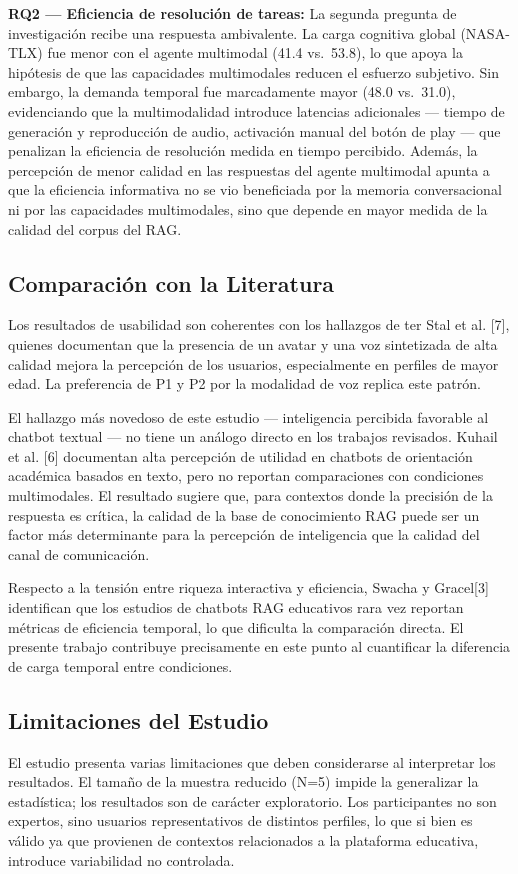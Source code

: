 \documentclass[conference]{IEEEtran}
\begin{document}
\textbf{RQ2 --- Eficiencia de resolución de tareas:} La segunda pregunta de investigación recibe una respuesta ambivalente. La carga cognitiva global (NASA-TLX) fue menor con el agente multimodal (41.4 vs.~53.8), lo que apoya la hipótesis de que las capacidades multimodales reducen el esfuerzo subjetivo. Sin embargo, la demanda temporal fue marcadamente mayor (48.0 vs.~31.0), evidenciando que la multimodalidad introduce latencias adicionales --- tiempo de generación y reproducción de audio, activación manual del botón de play --- que penalizan la eficiencia de resolución medida en tiempo percibido. Además, la percepción de menor calidad en las respuestas del agente multimodal apunta a que la eficiencia informativa no se vio beneficiada por la memoria conversacional ni por las capacidades multimodales, sino que depende en mayor medida de la calidad del corpus del RAG.

\subsection{Comparación con la Literatura}
Los resultados de usabilidad son coherentes con los hallazgos de ter Stal et al. [7], quienes documentan que la presencia de un avatar y una voz sintetizada de alta calidad mejora la percepción de los usuarios, especialmente en perfiles de mayor edad. La preferencia de P1 y P2 por la modalidad de voz replica este patrón.

El hallazgo más novedoso de este estudio --- inteligencia percibida favorable al chatbot textual --- no tiene un análogo directo en los trabajos revisados. Kuhail et al. [6] documentan alta percepción de utilidad en chatbots de orientación acad\'emica basados en texto, pero no reportan comparaciones con condiciones multimodales. El resultado sugiere que, para contextos donde la precisión de la respuesta es crítica, la calidad de la base de conocimiento RAG puede ser un factor más determinante para la percepción de inteligencia que la calidad del canal de comunicación.

Respecto a la tensión entre riqueza interactiva y eficiencia, Swacha y Gracel[3] identifican que los estudios de chatbots RAG educativos rara vez reportan métricas de eficiencia temporal, lo que dificulta la comparación directa. El presente trabajo contribuye precisamente en este punto al cuantificar la diferencia de carga temporal entre condiciones.

\subsection{Limitaciones del Estudio}
El estudio presenta varias limitaciones que deben considerarse al interpretar los resultados. El tamaño de la muestra reducido (N=5) impide la generalizar la estadística; los resultados son de carácter exploratorio. Los participantes no son expertos, sino usuarios representativos de distintos perfiles, lo que si bien es válido ya que provienen de contextos relacionados a la plataforma educativa, introduce variabilidad no controlada.
\end{document}
